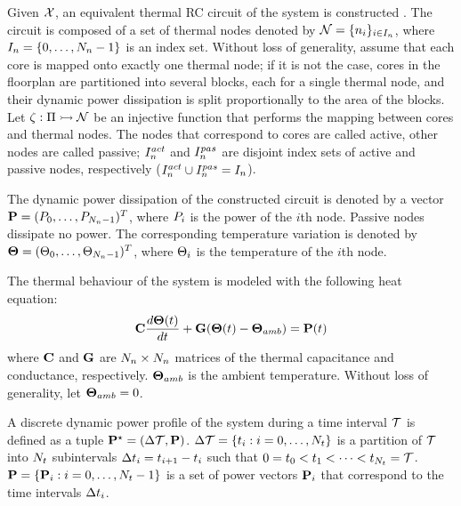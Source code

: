Given $\mathcal{X}$, an equivalent thermal RC circuit of the system is constructed \cite{kreith2000}. The circuit is composed of a set of thermal nodes denoted by $\mathcal{N} = \{ n_i \}_{i \in I_n}$, where $I_n = \{ 0, \dots, N_n - 1 \}$ is an index set. Without loss of generality, assume that each core is mapped onto exactly one thermal node; if it is not the case, cores in the floorplan are partitioned into several blocks, each for a single thermal node, and their dynamic power dissipation is split proportionally to the area of the blocks. Let $\zeta: \Pi \rightarrowtail \mathcal{N}$ be an injective function that performs the mapping between cores and thermal nodes. The nodes that correspond to cores are called active, other nodes are called passive; $I_n^{act}$ and $I_n^{pas}$ are disjoint index sets of active and passive nodes, respectively ($I_n^{act} \cup I_n^{pas} = I_n$).

The dynamic power dissipation of the constructed circuit is denoted by a vector $\mathbf{P} = (P_0, \dots, P_{N_n - 1})^T$, where $P_i$ is the power of the $i$th node. Passive nodes dissipate no power. The corresponding temperature variation is denoted by $\mathbf{\Theta} = (\Theta_0, \dots, \Theta_{N_n - 1})^T$, where $\Theta_i$ is the temperature of the $i$th node.

The thermal behaviour of the system is modeled with the following heat equation:
\begin{equation} \equlabel{fourier}
  \mcapacitance \frac{d\vtemperature(\time)}{d\time} + \mconductance (\vtemperature(\time) - \vtemperature_{amb}) = \vpower(\time)
\end{equation}
where $\mathbf{C}$ and $\mathbf{G}$ are $N_n \times N_n$ matrices of the thermal capacitance and conductance, respectively. $\mathbf{\Theta}_{amb}$ is the ambient temperature. Without loss of generality, let $\mathbf{\Theta}_{amb} = 0$.

A discrete dynamic power profile of the system during a time interval $\mathcal{T}$ is defined as a tuple $\mathbf{P}^\star = (\Delta \mathcal{T}, \mathbf{P})$. $\Delta \mathcal{T} = \{ t_i: i = 0, \dots, N_t \}$ is a partition of $\mathcal{T}$ into $N_t$ subintervals $\Delta t_i = t_{i+1} - t_i$ such that $0 = t_0 < t_1 < \dots < t_{N_t} = \mathcal{T}$. $\mathbf{P} = \{ \mathbf{P}_i: i = 0, \dots, N_t - 1 \}$ is a set of power vectors $\mathbf{P}_i$ that correspond to the time intervals $\Delta t_i$.

